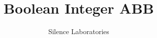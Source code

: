 \documentclass{article}
\begin{document}
\title{Boolean Integer ABB}
\author{Silence Laboratories}
\maketitle





\end{document}
